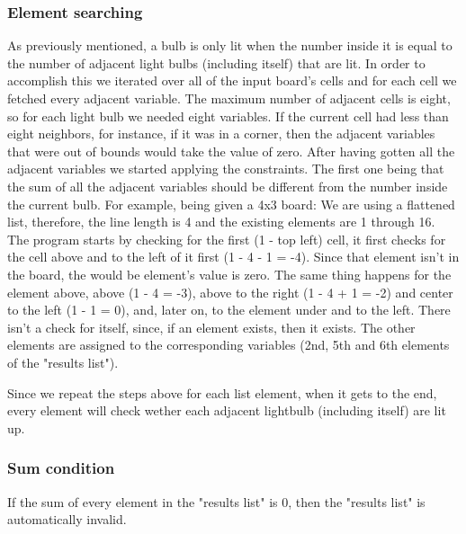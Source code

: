 \documentclass[runningheads]{llncs}
\begin{document}
\subsubsection{Element searching} \hfill \break
As previously mentioned, a bulb is only lit when the number inside it is equal to the number of adjacent light bulbs (including itself) that are lit. In order to accomplish this we iterated over all of the input board's cells and for each cell we fetched every adjacent variable. The maximum number of adjacent cells is eight, so for each light bulb we needed eight variables. If the current cell had less than eight neighbors, for instance, if it was in a corner, then the adjacent variables that were out of bounds would take the value of zero.
After having gotten all the adjacent variables we started applying the constraints. The first one being that the sum of all the adjacent variables should be different from the number inside the current bulb.
For example, being given a 4x3 board:
We are using a flattened list, therefore, the line length is 4 and the existing elements are 1 through 16.
The program starts by checking for the first (1 - top left) cell, it first checks for the cell above and to the left of it first (1 - 4 - 1 = -4). Since that element isn't in the board, the would be element's value is zero.
The same thing happens for the element above, above (1 - 4 = -3), above to the right (1 - 4 + 1 = -2) and center to the left (1 - 1 = 0), and, later on, to the element under and to the left.
There isn't a check for itself, since, if an element exists, then it exists.
The other elements are assigned to the corresponding variables (2nd, 5th and 6th elements of the "results list").

Since we repeat the steps above for each list element, when it gets to the end, every element will check wether each adjacent lightbulb (including itself) are lit up.

\subsubsection*{Sum condition} \hfill \break
If the sum of every element in the "results list" is 0, then the "results list" is automatically invalid.
\end{document}
